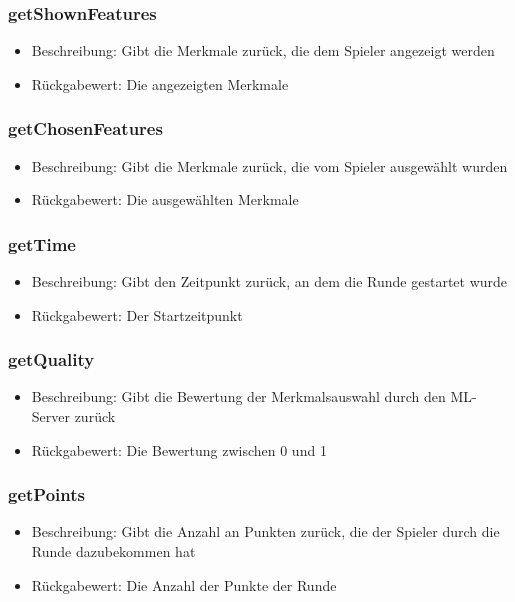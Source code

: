 \documentclass[a4paper]{scrreprt}
\begin{document}
    \subsubsection{getShownFeatures}
    \begin{itemize}
        \item Beschreibung: Gibt die Merkmale zurück, die dem Spieler angezeigt werden
        \item Rückgabewert: Die angezeigten Merkmale
    \end{itemize}
    \subsubsection{getChosenFeatures}
    \begin{itemize}
        \item Beschreibung: Gibt die Merkmale zurück, die vom Spieler ausgewählt wurden
        \item Rückgabewert: Die ausgewählten Merkmale
    \end{itemize}
    \subsubsection{getTime}
    \begin{itemize}
        \item Beschreibung: Gibt den Zeitpunkt zurück, an dem die Runde gestartet wurde
        \item Rückgabewert: Der Startzeitpunkt
    \end{itemize}
    \subsubsection{getQuality}
    \begin{itemize}
        \item Beschreibung: Gibt die Bewertung der Merkmalsauswahl durch den ML-Server zurück
        \item Rückgabewert: Die Bewertung zwischen 0 und 1
    \end{itemize}
    \subsubsection{getPoints}
    \begin{itemize}
        \item Beschreibung: Gibt die Anzahl an Punkten zurück, die der Spieler durch die Runde dazubekommen hat
        \item Rückgabewert: Die Anzahl der Punkte der Runde
    \end{itemize}
\end{document}
